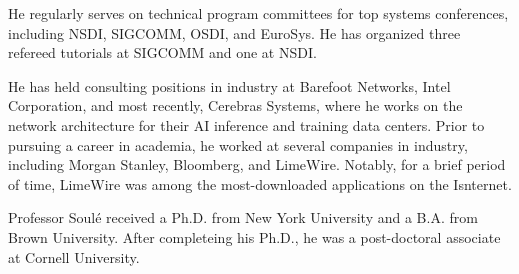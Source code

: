\documentclass[11pt]{article}
\begin{document}

He regularly serves on technical program committees for top systems
conferences, including NSDI, SIGCOMM, OSDI, and EuroSys. He has
organized three refereed tutorials at SIGCOMM and one at NSDI.


He has held consulting positions in industry at Barefoot Networks,
Intel Corporation, and most recently, Cerebras Systems, where he works
on the network architecture for their AI inference and training data
centers.  Prior to pursuing a career in academia, he worked at several
companies in industry, including Morgan Stanley, Bloomberg, and
LimeWire. Notably, for a brief period of time, LimeWire was among the
most-downloaded applications on the Isnternet.


Professor Soul\'{e} received a Ph.D. from New York University and a
B.A. from Brown University. After completeing his Ph.D., he was a
post-doctoral associate at Cornell University.
\end{document}
